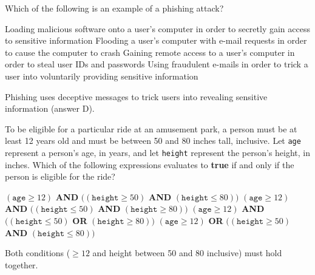 



\question[5]
Which of the following is an example of a phishing attack?
\begin{choices}
  \choice Loading malicious software onto a user's computer in order to secretly gain access to sensitive information
  \choice Flooding a user's computer with e-mail requests in order to cause the computer to crash
  \choice Gaining remote access to a user's computer in order to steal user IDs and passwords
  \CorrectChoice Using fraudulent e-mails in order to trick a user into voluntarily providing sensitive information
\end{choices}
\begin{solution}
  Phishing uses deceptive messages to trick users into revealing sensitive information (answer D).
\end{solution}

\question[5]
To be eligible for a particular ride at an amusement park, a person must be at least 12 years old and must be between 50 and 80 inches tall, inclusive.
Let \texttt{age} represent a person's age, in years, and let \texttt{height} represent the person's height, in inches. Which of the following expressions evaluates to \textbf{true} if and only if the person is eligible for the ride?
\begin{choices}
  \CorrectChoice $(\texttt{age} \ge 12)$ \textbf{AND} $((\texttt{height} \ge 50)$ \textbf{AND} $(\texttt{height} \le 80))$
  \choice $(\texttt{age} \ge 12)$ \textbf{AND} $((\texttt{height} \le 50)$ \textbf{AND} $(\texttt{height} \ge 80))$
  \choice $(\texttt{age} \ge 12)$ \textbf{AND} $((\texttt{height} \le 50)$ \textbf{OR} $(\texttt{height} \ge 80))$
  \choice $(\texttt{age} \ge 12)$ \textbf{OR} $((\texttt{height} \ge 50)$ \textbf{AND} $(\texttt{height} \le 80))$
\end{choices}
\begin{solution}
  Both conditions (\(\ge 12\) and height between 50 and 80 inclusive) must hold together.
\end{solution}

